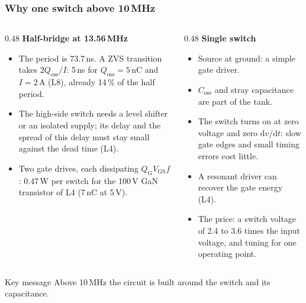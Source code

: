 \begin{frame}
	\frametitle{Why one switch above 10\,MHz}
	\begin{columns}[T]
		\begin{column}{0.48\textwidth}
			\footnotesize
			\textbf{Half-bridge at 13.56\,MHz}
			\begin{itemize}
				\item The period is 73.7\,ns. A ZVS transition takes $2Q_\mathrm{oss}/I$: 5\,ns for $Q_\mathrm{oss}=5$\,nC and $I=2$\,A (L8), already 14\,\% of the half period.
				\item The high-side switch needs a level shifter or an isolated supply; its delay and the spread of this delay must stay small against the dead time (L4).
				\item Two gate drives, each dissipating $Q_\mathrm{G}V_\mathrm{GS}f$: 0.47\,W per switch for the 100\,V GaN transistor of L4 (7\,nC at 5\,V).
			\end{itemize}
		\end{column}
		\begin{column}{0.48\textwidth}
			\footnotesize
			\textbf{Single switch}
			\begin{itemize}
				\item Source at ground: a simple gate driver.
				\item $C_\mathrm{oss}$ and stray capacitance are part of the tank.
				\item The switch turns on at zero voltage and zero $\mathrm{d}v/\mathrm{d}t$: slow gate edges and small timing errors cost little.
				\item A resonant driver can recover the gate energy (L4).
				\item The price: a switch voltage of 2.4 to 3.6 times the input voltage, and tuning for one operating point.
			\end{itemize}
		\end{column}
	\end{columns}
	\begin{block}{Key message}
		Above 10\,MHz the circuit is built around the switch and its capacitance.
	\end{block}
\end{frame}

